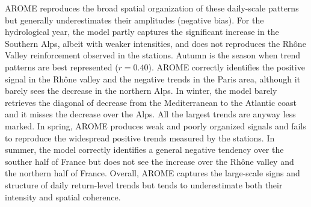 ﻿\documentclass[hess, manuscript]{copernicus}
\providecommand{\DIFadd}[1]{{\protect\color{blue}\uwave{#1}}} %
\providecommand{\DIFaddbegin}{} %
\providecommand{\DIFaddend}{} %
\begin{document}
AROME reproduces the broad spatial organization of these daily-scale patterns but generally underestimates their amplitudes (negative bias). For the hydrological year, the model partly captures the significant increase in the Southern Alps, albeit with weaker intensities, and does not reproduces the Rhône Valley reinforcement observed in the stations. Autumn is the season when trend patterns are best represented ($r=0.40$). AROME correctly identifies the positive signal in the Rhône valley and the negative trends in the Paris area, although it barely sees the decrease in the northern Alps. In winter, the model barely retrieves the diagonal of decrease from the Mediterranean to the Atlantic coast and it misses the decrease over the Alps. All the largest trends are anyway less marked. In spring, AROME produces weak and poorly organized signals and fails to reproduce the widespread positive trends measured by the stations. In summer, the model correctly identifies a general negative tendency over the souther half of France but does not see the increase over the Rhône valley and the northern half of France. Overall, AROME \DIFaddbegin \DIFadd{moderately }\DIFaddend captures the large-scale signs and structure of daily return-level trends but tends to underestimate both their intensity and spatial coherence.
\end{document}
